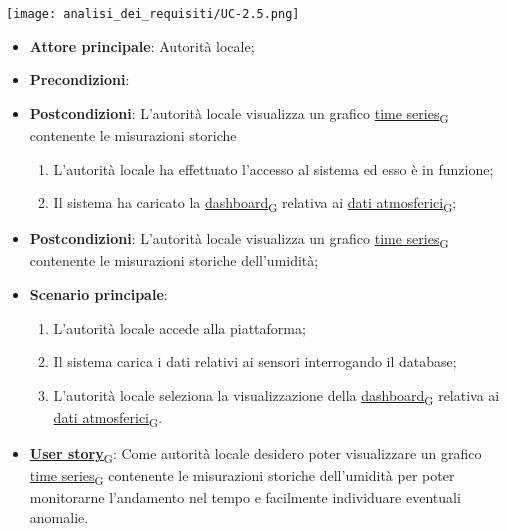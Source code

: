 \begin{center}
	\texttt{[image: analisi\_dei\_requisiti/UC-2.5.png]}
\end{center}

\begin{itemize}
	\item \textbf{Attore principale}: Autorità locale;
	\item \textbf{Precondizioni}: 	\item \textbf{Postcondizioni}: L'autorità locale visualizza un grafico \href{https://7last.github.io/docs/rtb/documentazione-interna/glossario\#time-series}{time series\textsubscript{G}} contenente le misurazioni storiche
	      \begin{enumerate}
		      \item L'autorità locale ha effettuato l'accesso al sistema ed esso è in funzione;
		      \item Il sistema ha caricato la \href{https://7last.github.io/docs/rtb/documentazione-interna/glossario\#dashboard}{dashboard\textsubscript{G}} relativa ai \href{https://7last.github.io/docs/rtb/documentazione-interna/glossario\#dati-atmosferici}{dati atmosferici\textsubscript{G}};
	      \end{enumerate}
	\item \textbf{Postcondizioni}: L'autorità locale visualizza un grafico \href{https://7last.github.io/docs/rtb/documentazione-interna/glossario\#time-series}{time series\textsubscript{G}} contenente le misurazioni storiche
	      dell'umidità;
	\item \textbf{Scenario principale}:
	      \begin{enumerate}
		      \item L'autorità locale accede alla piattaforma;
		      \item Il sistema carica i dati relativi ai sensori interrogando il database;
		      \item L'autorità locale seleziona la visualizzazione della \href{https://7last.github.io/docs/rtb/documentazione-interna/glossario\#dashboard}{dashboard\textsubscript{G}} relativa ai \href{https://7last.github.io/docs/rtb/documentazione-interna/glossario\#dati-atmosferici}{dati atmosferici\textsubscript{G}}.
	      \end{enumerate}
	\item \href{https://7last.github.io/docs/rtb/documentazione-interna/glossario\#user-story}{\textbf{User story}\textsubscript{G}}: Come autorità locale desidero poter visualizzare un grafico \href{https://7last.github.io/docs/rtb/documentazione-interna/glossario\#time-series}{time series\textsubscript{G}} contenente le misurazioni storiche dell'umidità
	      per poter monitorarne l'andamento nel tempo e facilmente individuare eventuali anomalie.
\end{itemize}

